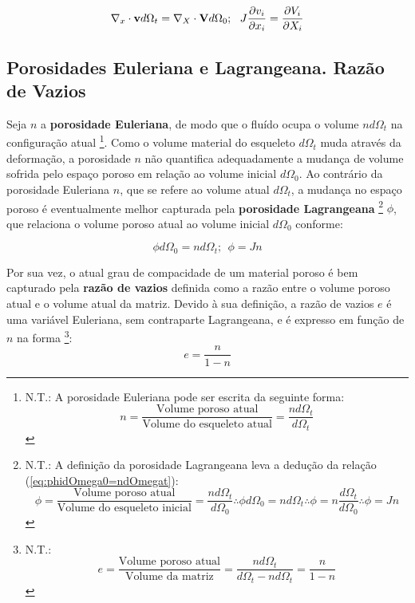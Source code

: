 \documentclass[
	11pt, %
	fleqn, %
	a4paper, %
]{LegrandOrangeBook}
\begin{document}
\begin{equation}
	\label{eq:nablaxvdOmegat=nablaXVdOmega0}	
	\nabla_x \cdot \textbf{v} d\Omega_t = \nabla_X \cdot \textbf{V} d\Omega_0; ~~ J\dfrac{\partial v_i}{\partial x_i} = \dfrac{\partial V_i}{\partial X_i}
\end{equation}

\subsection{Porosidades Euleriana e Lagrangeana. Razão de Vazios}

Seja $n$ a \textbf{porosidade Euleriana}, de modo que o fluído ocupa o volume $nd\Omega_t$ na configuração atual \footnote{N.T.: A porosidade Euleriana pode ser escrita da seguinte forma:
		\begin{displaymath}
		n = \dfrac{\text{Volume poroso atual}}{\text{Volume do esqueleto atual}} = \dfrac{nd\Omega_t}{d\Omega_t} 
		\end{displaymath}}. Como o volume material do esqueleto $d\Omega_t$ muda através da deformação, a porosidade $n$ não quantifica adequadamente a mudança de volume sofrida pelo espaço poroso em relação ao volume inicial $d\Omega_0$. Ao contrário da porosidade Euleriana $n$, que se refere ao volume atual $d\Omega_t$, a mudança no espaço poroso é eventualmente melhor capturada pela \textbf{porosidade Lagrangeana} \footnote{N.T.:
	A definição da porosidade Lagrangeana leva a dedução da relação (\ref{eq:phidOmega0=ndOmegat}):
	\begin{displaymath}		
		\phi = \dfrac{\text{Volume poroso atual}}{\text{Volume do esqueleto inicial}} = \dfrac{nd\Omega_t}{d\Omega_0} \therefore \phi d\Omega_0 = n d\Omega_t \therefore \phi = n \dfrac{d\Omega_t}{d\Omega_0} \therefore \phi = Jn
	\end{displaymath}
} $\phi$, que relaciona o volume poroso atual ao volume inicial $d\Omega_0$ conforme:

\begin{equation}
	\label{eq:phidOmega0=ndOmegat}	
\phi d\Omega_0 = n d\Omega_t; ~~\phi = Jn
\end{equation}

Por sua vez, o atual grau de compacidade de um material poroso é bem capturado pela \textbf{razão de vazios} definida como a razão entre o volume poroso atual e o volume atual da matriz. Devido à sua definição, a razão de vazios $e$ é uma variável Euleriana, sem contraparte Lagrangeana, e é expresso em função de $n$ na forma \footnote{N.T.:				
	\begin{displaymath}	
		e = \dfrac{\text{Volume poroso atual}}{\text{Volume da matriz}} = \dfrac{nd\Omega_t}{d\Omega_t-nd\Omega_t} = \dfrac{n}{1-n}
	\end{displaymath}}:
\begin{equation}
	\label{eq:e}	
	e = \dfrac{n}{1-n}
\end{equation}
\end{document}
